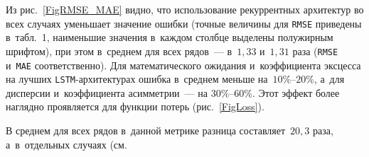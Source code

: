 \begin{multicols}{2}
Из рис.~\ref{FigRMSE_MAE} видно, что использование рекуррентных архитектур 
во всех случаях уменьшает значение ошибки (точные величины для 
\verb"RMSE" приведены в~табл.~1, наименьшие значения в~каж\-дом столбце 
выделены полужирным шрифтом), при этом в~среднем для всех рядов~--- в~$1{,}33$ 
и~$1{,}31$ раза (\verb"RMSE" и~\verb"MAE" соответственно). Для математического 
ожидания и~коэффициента эксцесса на лучших \verb"LSTM"-ар\-хи\-тек\-ту\-рах 
ошибка в~среднем меньше на~$10\%$--$20\%$, а~для дисперсии и~коэффициента 
асимметрии~--- на $30\%$--$60\%$.  Этот эффект более наглядно проявляется 
для функции потерь (рис.~\ref{FigLoss}).



В среднем для всех рядов в~данной метрике разница составляет~$20{,}3$ раза, 
а~в~отдельных случаях (см.\linebreak\vspace*{-12pt}

\pagebreak



\end{multicols}

